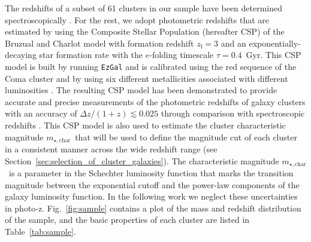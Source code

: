 \documentclass[useAMS,usenatbib,iop,numberedappendix]{mn2e}
\newcommand{\redshift}{\ensuremath{z}}
\newcommand{\mstarchar}{\ensuremath{m_{\star, \mathrm{char}}}}
\begin{document}
The redshifts of a subset of 61 clusters in our sample have been determined spectroscopically \citep{ruel14,bayliss16}. 
For the rest, we adopt photometric redshifts that are estimated by using the Composite Stellar Population (hereafter CSP) of the Bruzual and Charlot \cite[BC03;][]{bruzual03} model with formation redshift  ${\redshift}_{\mathrm{f}}=3$ and an exponentially-decaying star formation rate with the $e$-folding timescale $\tau = 0.4$~Gyr.
This CSP model is built by running \texttt{EzGal} \citep{mancone12b} and is calibrated using the red sequence of the Coma cluster and by using six different metallicities associated with different luminosities \citep[see more details in][]{song12a}.
The resulting CSP model has been demonstrated to provide accurate and precise measurements of the photometric redshifts of galaxy clusters with an 
accuracy of $\Delta\redshift / (1 + \redshift)\lesssim0.025$ through comparison with spectroscopic redshifts \citep{song12a,song12b,liu15b,bleem15}.  
This CSP model is also used to estimate the cluster characteristic magnitude \mstarchar\ that will be used to define the magnitude cut of each cluster in a consistent manner across the wide redshift range (see Section~\ref{sec:selection_of_cluster_galaxies}).
The characteristic magnitude \mstarchar\ is a parameter in the Schechter luminosity function that marks the transition magnitude between the exponential cutoff and the power-law components of the galaxy luminosity function.
In the following work we neglect these uncertainties in photo-z.  Fig.~\ref{fig:sample} contains a plot of the mass and redshift distribution of the sample, and the basic properties of each cluster are listed in Table~\ref{tab:sample}.
\end{document}
